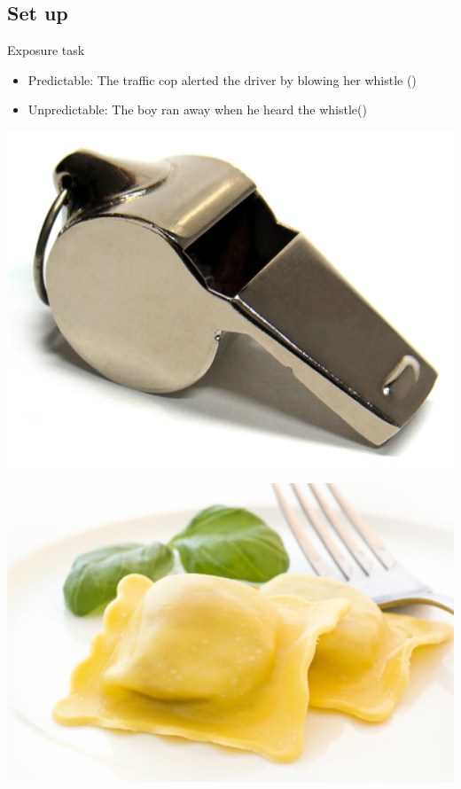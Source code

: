 \documentclass{beamer}
\begin{document}
\subsection{Set up}

\begin{frame}{Exposure task}
\begin{itemize}
\item Predictable: The traffic cop alerted the driver by blowing her whistle () 
\item Unpredictable: The boy ran away when he heard the whistle()
\end{itemize}
\begin{minipage}[t]{0.45\textwidth}
\includegraphics[width=1.0\textwidth]{pictures/whistle}
\end{minipage}
\hfill
\begin{minipage}[t]{0.45\textwidth}
\includegraphics[width=1.0\textwidth]{pictures/ravioli}
\end{minipage}
\end{frame}
\end{document}
